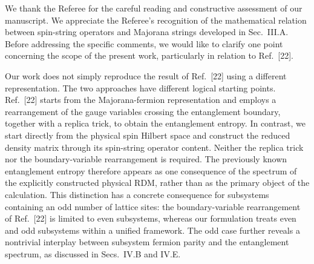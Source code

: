 \documentclass[12pt]{article}
\begin{document}

We thank the Referee for the careful reading and constructive assessment of our manuscript. We appreciate the Referee's recognition of the mathematical relation between spin-string operators and Majorana strings developed in Sec.~III.A. Before addressing the specific comments, we would like to clarify one point concerning the scope of the present work, particularly in relation to Ref.~[22].

Our work does not simply reproduce the result of Ref.~[22] using a different representation. The two approaches have different logical starting points. Ref.~[22] starts from the Majorana-fermion representation and employs a rearrangement of the gauge variables crossing the entanglement boundary, together with a replica trick, to obtain the entanglement entropy. In contrast, we start directly from the physical spin Hilbert space and construct the reduced density matrix through its spin-string operator content. Neither the replica trick nor the boundary-variable rearrangement is required. The previously known entanglement entropy therefore appears as one consequence of the spectrum of the explicitly constructed physical RDM, rather than as the primary object of the calculation. This distinction has a concrete consequence for subsystems containing an odd number of lattice sites: the boundary-variable rearrangement of Ref.~[22] is limited to even subsystems, whereas our formulation treats even and odd subsystems within a unified framework. The odd case further reveals a nontrivial interplay between subsystem fermion parity and the entanglement spectrum, as discussed in Secs.~IV.B and IV.E.
\end{document}
